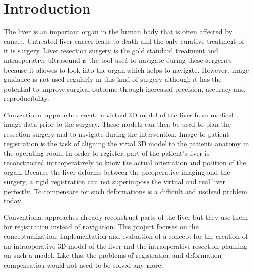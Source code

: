 %
%
%

\chapter{Introduction}
The liver is an important organ in the human body that is often affected by
cancer. Untreated liver
cancer leads to death and the only curative treatment of it is surgery. Liver
resection surgery is the gold standard treatment and intraoperative ultrasound is the
tool used to navigate during these surgeries because it allowes to look into the
organ which helps to navigate. However, image guidance is not used regularly in
this kind of surgery
although it has the potential to improve
surgical outcome through increased precision, accuracy and reproducibility.

Conventional approaches create a virtual 3D model of the liver from medical
image data prior to the surgery. These models can then be used to plan the
resection surgery and to navigate during the intervention. Image to patient
registration is the task of aligning the virtal 3D model to the patients anatomy
in the operating room. In order to register, part of the patient's liver is
reconstructed intraoperatively to know the actual orientation and position of
the organ. Because the liver deforms between the preoperative imaging
and the surgery, a rigid registration can not superimpose the virtual and real
liver perfectly. To compensate for such deformations is a difficult and usolved
problem today.

Conventional approaches already reconstruct parts of the liver but they use them
for registration instead of navigation. This project focuses on the conceptualization, implementation and evaluation of a concept for the creation of an
intraoperative 3D model of the liver and the intraoperative resection planning
on such a model. Like this, the problems of registration and deformation
compensation would not need to be solved any more.  

